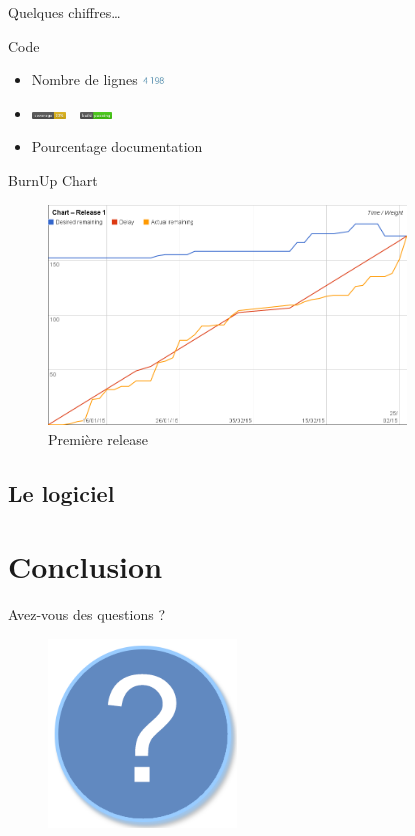 \documentclass{beamer}
\begin{document}
\begin{frame}{Quelques chiffres\ldots}
	\begin{block}{Code}
		\begin{itemize}
			\item Nombre de lignes \includegraphics[height=9px]{images/stats/nblines.jpg}
			\item \includegraphics[height=7px]{images/coverage.png}~~\includegraphics[height=7px]{images/build.png}
			\item Pourcentage documentation
		\end{itemize}
	\end{block}

\end{frame}

\begin{frame}{BurnUp Chart}
	\begin{figure}[H]
		\includegraphics[width=9.5cm]{images/release1Chart.png}
		\caption{Première release}
	\end{figure}
\end{frame}

\subsection{Le logiciel}
\begin{frame}
\end{frame}

\section*{Conclusion} %
\begin{frame}
	
\end{frame}

\begin{frame}{Avez-vous des questions ?}
	\begin{figure}[H]
		\centering
		\includegraphics[width=5cm]{interrogation.png}
	\end{figure}
\end{frame}
\end{document}
